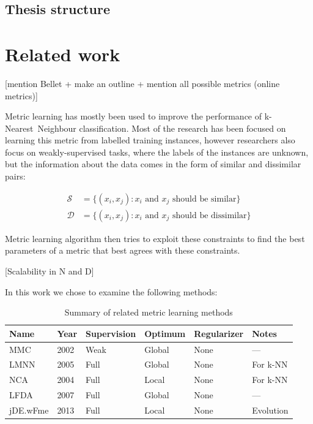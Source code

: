 \documentclass[12pt,a4paper]{report}
\begin{document}
\section{Thesis structure}


\chapter{Related work} \label{chap:rw}

[mention Bellet + make an outline + mention all possible metrics (online metrics)]

Metric learning has mostly been used to improve the performance of k-Nearest~Neighbour classification. Most of the research has been focused on learning this metric from labelled training instances, however researchers also focus on weakly-supervised tasks, where the labels of the instances are unknown, but the information about the data comes in the form of similar and dissimilar pairs:

\begin{align}
\mathcal{S} &= \lbrace(x_i,x_j): x_i \text{ and } x_j \text{ should be similar} \rbrace \\
\mathcal{D} &= \lbrace(x_i,x_j): x_i \text{ and } x_j \text{ should be dissimilar} \rbrace
\end{align}

Metric learning algorithm then tries to exploit these constraints to find the best parameters of a metric that best agrees with these constraints.

[Scalability in N and D] %

In this work we chose to examine the following methods:

\begin{table}[ht] \centering
\caption{Summary of related metric learning methods} \label{tab:rw:summary}
\begin{tabular}{llllll}
\hline
Name & Year & Supervision & Optimum & Regularizer & Notes \\
\hline
MMC & 2002 & Weak & Global & None & — \\
LMNN & 2005 & Full & Global & None & For k-NN \\
NCA & 2004 & Full & Local & None & For k-NN \\
LFDA & 2007 & Full & Global & None & — \\
jDE.wFme & 2013 & Full & Local & None & Evolution \\
\hline
\end{tabular}
\end{table}
\end{document}
